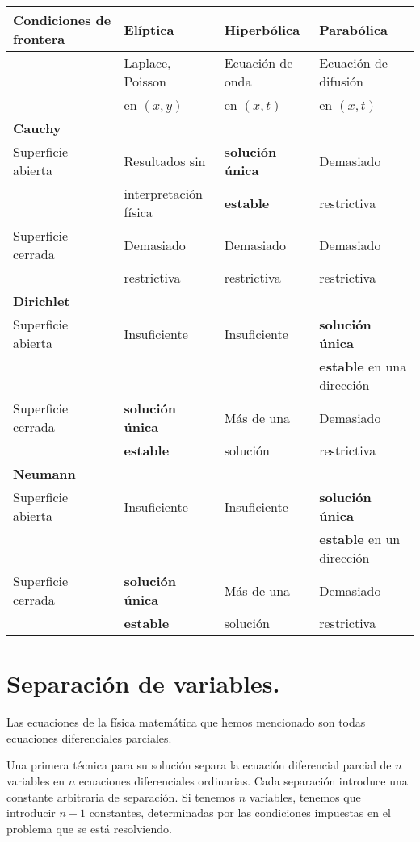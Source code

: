 \begin{center}
{ \fontsize{12}{12} \selectfont
\begin{tabular}{ l l l l} \hline
Condiciones de frontera & Elíptica & Hiperbólica & Parabólica \\ \hline
 & Laplace, Poisson & Ecuación de onda & Ecuación de difusión \\
 & en $(x,y)$  &  en $(x,t)$ &  en $(x,t)$ \\ 
\textbf{Cauchy} & & & \\ \hline
Superficie abierta & Resultados sin & \textbf{solución única}  & Demasiado \\ 
 & interpretación física & \textbf{estable} & restrictiva \\ 
Superficie cerrada & Demasiado & Demasiado & Demasiado \\
 & restrictiva & restrictiva & restrictiva \\
\textbf{Dirichlet} & & & \\ \hline
Superficie abierta & Insuficiente & Insuficiente  & \textbf{solución única} \\ 
 & & & \textbf{estable} en una dirección \\ 
Superficie cerrada & \textbf{solución única} & Más de una & Demasiado \\
 & \textbf{estable} & solución & restrictiva \\
 \textbf{Neumann} & & & \\ \hline
Superficie abierta & Insuficiente & Insuficiente  & \textbf{solución única} \\ 
 & & & \textbf{estable} en un dirección \\ 
Superficie cerrada & \textbf{solución única} & Más de una & Demasiado \\
 & \textbf{estable} & solución & restrictiva \\
\end{tabular}
}
\end{center}
\section{Separación de variables.}
% 
Las ecuaciones de la física matemática que hemos mencionado son todas ecuaciones diferenciales parciales.
\par
Una primera técnica para su solución separa la ecuación diferencial parcial de $n$ variables en $n$ ecuaciones diferenciales ordinarias. Cada separación introduce una constante arbitraria de separación. Si tenemos $n$ variables, tenemos que introducir $n-1$ constantes, determinadas por las condiciones impuestas en el problema que se está resolviendo.
